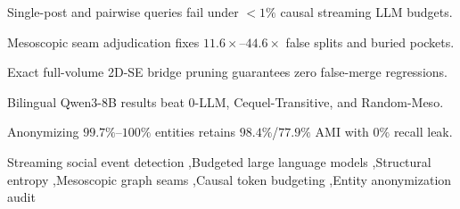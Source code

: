 \documentclass[preprint,12pt,authoryear]{elsarticle}
\begin{document}
\begin{frontmatter}
\begin{highlights}
\item Single-post and pairwise queries fail under $<1\%$ causal streaming LLM budgets.
\item Mesoscopic seam adjudication fixes $11.6\times$--$44.6\times$ false splits and buried pockets.
\item Exact full-volume 2D-SE bridge pruning guarantees zero false-merge regressions.
\item Bilingual Qwen3-8B results beat 0-LLM, Cequel-Transitive, and Random-Meso.
\item Anonymizing $99.7\%$--$100\%$ entities retains $98.4\%$/$77.9\%$ AMI with $0\%$ recall leak.
\end{highlights}

\begin{keyword}
Streaming social event detection \sep Budgeted large language models \sep Structural entropy \sep Mesoscopic graph seams \sep Causal token budgeting \sep Entity anonymization audit
\end{keyword}

\end{frontmatter}











\clearpage
\appendix

\end{document}
